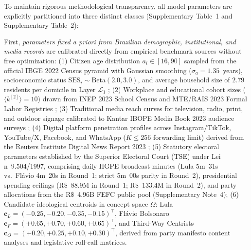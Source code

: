 \documentclass[11pt,a4paper]{article}
\begin{document}
To maintain rigorous methodological transparency, all model parameters are explicitly partitioned into three distinct classes (Supplementary Table~1 and Supplementary Table~2):

First, \emph{parameters fixed a priori from Brazilian demographic, institutional, and media records} are calibrated directly from empirical benchmark sources without free optimization:
(1) Citizen age distribution $a_i \in [16, 90]$ sampled from the official IBGE 2022 Census pyramid with Gaussian smoothing ($\sigma_a = 1.35$~years), socioeconomic status $\mathrm{SES}_i \sim \mathrm{Beta}(2.0, 3.0)$, and average household size of $2.79$ residents per domicile in Layer $\mathcal{L}_1$ \citep{ibge2022censo};
(2) Workplace and educational cohort sizes ($\langle k^{[2]} \rangle = 10$) drawn from INEP 2023 School Census and MTE/RAIS 2023 Formal Labor Registries \citep{inep2023censo, mte2023rais};
(3) Traditional media reach curves for television, radio, print, and outdoor signage calibrated to Kantar IBOPE Media Book 2023 audience surveys \citep{kantar2023inside};
(4) Digital platform penetration profiles across Instagram/TikTok, YouTube/X, Facebook, and WhatsApp ($K \le 256$ forwarding limit) derived from the Reuters Institute Digital News Report 2023 \citep{reuters2023digital};
(5) Statutory electoral parameters established by the Superior Electoral Court (TSE) under Lei n\textordmasculine~9.504/1997, comprising daily HGPE broadcast minutes (Lula 5m~31s vs.\ Fl\'avio 4m~20s in Round~1; strict 5m~00s parity in Round~2), presidential spending ceilings ($\mathrm{R}\$$~88.9M in Round~1; $\mathrm{R}\$$~133.4M in Round~2), and party allocations from the $\mathrm{R}\$$~4.96B FEFC public pool (Supplementary Note~4);
(6) Candidate ideological centroids in concept space $\Omega$: Lula $\mathbf{c}_L = (-0.25, -0.20, -0.35, -0.15)^{\top}$, Fl\'avio Bolsonaro $\mathbf{c}_F = (+0.65, +0.70, +0.60, +0.65)^{\top}$, and Third-Way Centrists $\mathbf{c}_O = (+0.20, +0.25, +0.10, +0.30)^{\top}$, derived from party manifesto content analyses and legislative roll-call matrices.
\end{document}
